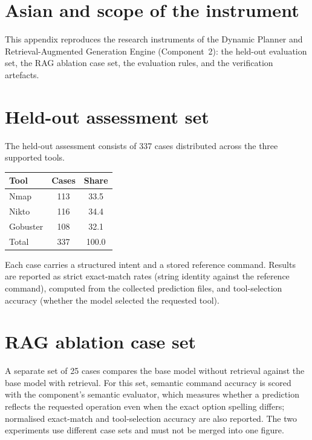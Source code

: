 \section{Asian and scope of the instrument}

This appendix reproduces the research instruments of the Dynamic Planner and
Retrieval-Augmented Generation Engine (Component~2): the held-out evaluation
set, the RAG ablation case set, the evaluation rules, and the verification
artefacts.

\section{Held-out assessment set}

The held-out assessment consists of 337 cases distributed across the three
supported tools.

\begin{center}
\begin{tabular}{@{}lcc@{}}
  \toprule
  \textbf{Tool} & \textbf{Cases} & \textbf{Share}\\
  \midrule
  Nmap & 113 & 33.5\\
  Nikto & 116 & 34.4\\
  Gobuster & 108 & 32.1\\
  \midrule
  Total & 337 & 100.0\\
  \bottomrule
\end{tabular}
\end{center}

Each case carries a structured intent and a stored reference command. Results
are reported as strict exact-match rates (string identity against the reference
command), computed from the collected prediction files, and tool-selection
accuracy (whether the model selected the requested tool).

\section{RAG ablation case set}

A separate set of 25 cases compares the base model without retrieval against
the base model with retrieval. For this set, semantic command accuracy is
scored with the component's semantic evaluator, which measures whether a
prediction reflects the requested operation even when the exact option spelling
differs; normalised exact-match and tool-selection accuracy are also reported.
The two experiments use different case sets and must not be merged into one
figure.

